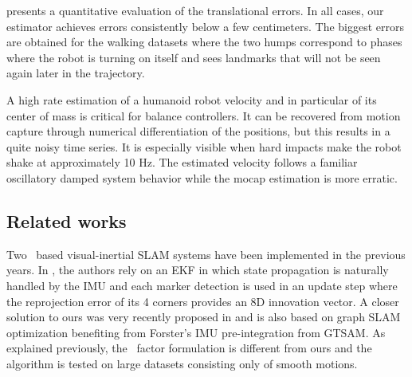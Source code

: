  presents a quantitative evaluation of the translational errors. In all cases, our estimator achieves errors consistently below a few centimeters. 
The biggest errors are obtained for the walking datasets where the two humps correspond to phases where the robot is turning on itself and sees landmarks that will not be 
seen again later in the trajectory.

A high rate estimation of a humanoid robot velocity and in particular of its center of mass is critical for balance controllers. It can be recovered from motion capture through numerical differentiation of the positions, but this results in a quite noisy time series. It is especially visible when hard impacts make the robot shake at approximately 10 Hz. 
The estimated velocity follows a familiar oscillatory damped system behavior while the mocap estimation is more erratic. 


\subsection{Related works}
Two \apriltag\ based visual-inertial SLAM systems have been implemented in the previous years. 
In \cite{neunert2016open}, the authors rely on an EKF in which state propagation is naturally 
handled by the IMU and each marker detection is used in an update step where the reprojection error of its 4 corners provides an 8D innovation vector. 
A closer solution to ours was very recently proposed in \cite{he2019lightweight} and is also based on graph SLAM optimization benefiting from 
Forster's IMU pre-integration from GTSAM. As explained previously, the \apriltag\  factor formulation is different from ours and the algorithm is tested 
on large datasets consisting only of smooth motions.
